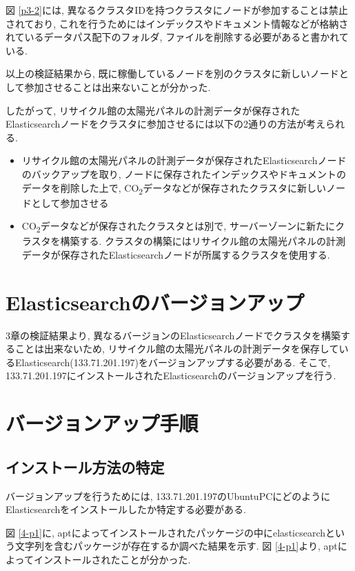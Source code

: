 図 \ref{p3-2}には, 異なるクラスタIDを持つクラスタにノードが参加することは禁止されており, これを行うためにはインデックスやドキュメント情報などが格納されているデータパス配下のフォルダ, ファイルを削除する必要があると書かれている.

以上の検証結果から, 既に稼働しているノードを別のクラスタに新しいノードとして参加させることは出来ないことが分かった.

したがって, リサイクル館の太陽光パネルの計測データが保存されたElasticsearchノードをクラスタに参加させるには以下の2通りの方法が考えられる.

\begin{itemize}
  \item リサイクル館の太陽光パネルの計測データが保存されたElasticsearchノードのバックアップを取り, ノードに保存されたインデックスやドキュメントのデータを削除した上で, CO\textsubscript{2}データなどが保存されたクラスタに新しいノードとして参加させる
  \item CO\textsubscript{2}データなどが保存されたクラスタとは別で, サーバーゾーンに新たにクラスタを構築する. クラスタの構築にはリサイクル館の太陽光パネルの計測データが保存されたElasticsearchノードが所属するクラスタを使用する.
\end{itemize}


\section{Elasticsearchのバージョンアップ}
3章の検証結果より, 異なるバージョンのElasticsearchノードでクラスタを構築することは出来ないため, リサイクル館の太陽光パネルの計測データを保存しているElasticsearch(133.71.201.197)をバージョンアップする必要がある. そこで, 133.71.201.197にインストールされたElasticsearchのバージョンアップを行う.

\section{バージョンアップ手順}

\subsection{インストール方法の特定}

バージョンアップを行うためには, 133.71.201.197のUbuntuPCにどのようにElasticsearchをインストールしたか特定する必要がある.

図 \ref{4-p1}に, aptによってインストールされたパッケージの中にelasticsearchという文字列を含むパッケージが存在するか調べた結果を示す.
図 \ref{4-p1}より, aptによってインストールされたことが分かった.

